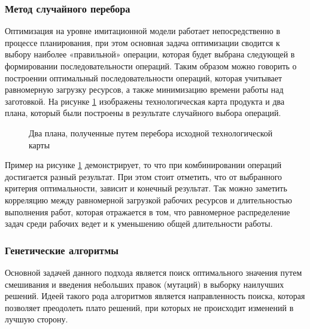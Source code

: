 \subsubsection*{Метод случайного перебора}
Оптимизация на уровне имитационной модели работает непосредственно в процессе планирования, при этом основная задача оптимизации сводится к выбору наиболее «правильной» операции, которая будет выбрана следующей в формировании последовательности операций. Таким образом можно говорить о построении оптимальный последовательности операций, которая учитывает равномерную загрузку ресурсов, а также минимизацию времени работы над заготовкой. На рисунке \ref{ris:Force} изображены технологическая карта продукта и два плана, который были построены в результате случайного выбора операций.

\begin{figure}[H]
    \caption{Два плана, полученные путем перебора исходной технологической карты}
    \label{ris:Force}
\end{figure}

Пример на рисунке \ref{ris:Force} демонстрирует, то что при комбинировании операций достигается разный результат. При этом стоит отметить, что от выбранного критерия оптимальности, зависит и конечный результат. Так можно заметить корреляцию между равномерной загрузкой рабочих ресурсов и длительностью выполнения работ, которая отражается в том, что равномерное распределение задач среди рабочих ведет и к уменьшению общей длительности работы.

\subsubsection*{Генетические алгоритмы}
Основной задачей данного подхода является поиск оптимального значения путем смешивания и введения небольших правок (мутаций) в выборку наилучших решений.
Идеей такого рода алгоритмов является направленность поиска, которая позволяет преодолеть плато решений, при которых не происходит изменений в лучшую сторону. 



